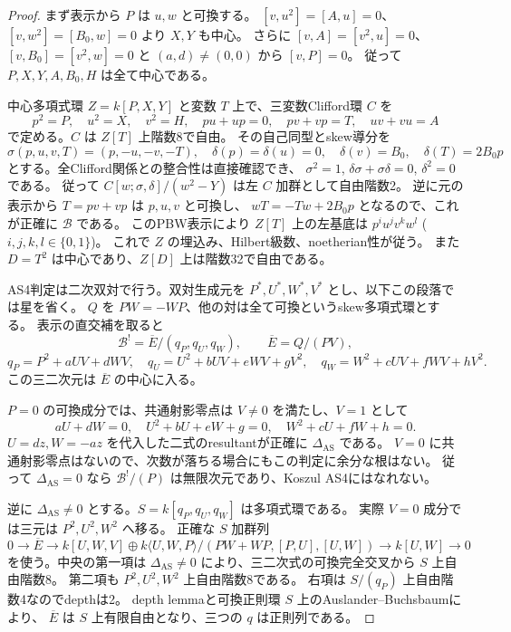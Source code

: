 \begin{proof}
まず表示から $P$ は $u,w$ と可換する。
$[v,u^2]=[A,u]=0$、$[v,w^2]=[B_0,w]=0$ より $X,Y$ も中心。
さらに $[v,A]=[v^2,u]=0$、$[v,B_0]=[v^2,w]=0$ と $(a,d)\ne(0,0)$ から $[v,P]=0$。
従って $P,X,Y,A,B_0,H$ は全て中心である。

中心多項式環 $Z=k[P,X,Y]$ と変数 $T$ 上で、三変数Clifford環 $C$ を
\[
 p^2=P,\quad u^2=X,\quad v^2=H,\quad
 pu+up=0,\quad pv+vp=T,\quad uv+vu=A
\]
で定める。$C$ は $Z[T]$ 上階数8で自由。
その自己同型とskew導分を
\[
 \sigma(p,u,v,T)=(p,-u,-v,-T),\quad
 \delta(p)=\delta(u)=0,\quad\delta(v)=B_0,\quad\delta(T)=2B_0p
\]
とする。全Clifford関係との整合性は直接確認でき、
$\sigma^2=1$, $\delta\sigma+\sigma\delta=0$, $\delta^2=0$ である。
従って $C[w;\sigma,\delta]/(w^2-Y)$ は左 $C$ 加群として自由階数2。
逆に元の表示から $T=pv+vp$ は $p,u,v$ と可換し、
$wT=-Tw+2B_0p$ となるので、これが正確に $\mathcal B$ である。
このPBW表示により $Z[T]$ 上の左基底は $p^i u^j v^k w^l$ ($i,j,k,l\in\{0,1\}$)。
これで $Z$ の埋込み、Hilbert級数、noetherian性が従う。
また $D=T^2$ は中心であり、$Z[D]$ 上は階数32で自由である。

AS4判定は二次双対で行う。双対生成元を $P^*,U^*,W^*,V^*$ とし、以下この段落では星を省く。
$Q$ を $PW=-WP$、他の対は全て可換というskew多項式環とする。
表示の直交補を取ると
\[
 \mathcal B^!=\overline E/(q_P,q_U,q_W),\qquad \overline E=Q/(PV),
\]
\[
 q_P=P^2+aUV+dWV,\quad
 q_U=U^2+bUV+eWV+gV^2,\quad
 q_W=W^2+cUV+fWV+hV^2.
\]
この三二次元は $\overline E$ の中心に入る。

$P=0$ の可換成分では、共通射影零点は $V\ne0$ を満たし、$V=1$ として
\[
 aU+dW=0,\quad U^2+bU+eW+g=0,\quad W^2+cU+fW+h=0.
\]
$U=dz,W=-az$ を代入した二式のresultantが正確に $\Delta_{\mathrm{AS}}$ である。
$V=0$ に共通射影零点はないので、次数が落ちる場合にもこの判定に余分な根はない。
従って $\Delta_{\mathrm{AS}}=0$ なら $\mathcal B^!/(P)$ は無限次元であり、Koszul AS4にはなれない。

逆に $\Delta_{\mathrm{AS}}\ne0$ とする。$S=k[q_P,q_U,q_W]$ は多項式環である。
実際 $V=0$ 成分では三元は $P^2,U^2,W^2$ へ移る。
正確な $S$ 加群列
\[
 0\longrightarrow\overline E\longrightarrow
 k[U,W,V]\oplus k\langle U,W,P\rangle/(PW+WP,[P,U],[U,W])
 \longrightarrow k[U,W]\longrightarrow0
\]
を使う。中央の第一項は $\Delta_{\mathrm{AS}}\ne0$ により、三二次式の可換完全交叉から $S$ 上自由階数8。
第二項も $P^2,U^2,W^2$ 上自由階数8である。
右項は $S/(q_P)$ 上自由階数4なのでdepthは2。
depth lemmaと可換正則環 $S$ 上のAuslander--Buchsbaumにより、
$\overline E$ は $S$ 上有限自由となり、三つの $q$ は正則列である。


\end{proof}
